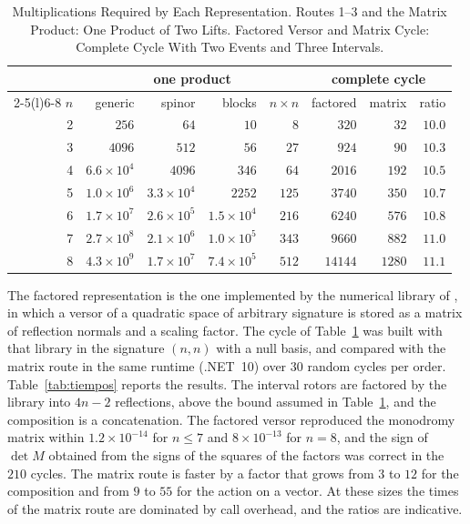 \documentclass[journal]{IEEEtran}
\begin{document}
\begin{table}[!h]
\caption{Multiplications Required by Each Representation. Routes 1--3 and
the Matrix Product: One Product of Two Lifts. Factored Versor and Matrix
Cycle: Complete Cycle With Two Events and Three Intervals.}
\label{tab:coste}
\centering
\footnotesize
\setlength{\tabcolsep}{3pt}
\begin{tabular}{@{}rrrrrrrr@{}}
\toprule
 & \multicolumn{4}{c}{one product} & \multicolumn{3}{c}{complete cycle} \\
\cmidrule(lr){2-5}\cmidrule(l){6-8}
$n$ & generic & spinor & blocks & $n\times n$ & factored & matrix & ratio \\
\midrule
2 & $256$ & $64$ & $10$ & $8$ & $320$ & $32$ & $10.0$ \\
3 & $4096$ & $512$ & $56$ & $27$ & $924$ & $90$ & $10.3$ \\
4 & $6.6\times10^{4}$ & $4096$ & $346$ & $64$ & $2016$ & $192$ & $10.5$ \\
5 & $1.0\times10^{6}$ & $3.3\times10^{4}$ & $2252$ & $125$ & $3740$ & $350$ & $10.7$ \\
6 & $1.7\times10^{7}$ & $2.6\times10^{5}$ & $1.5\times10^{4}$ & $216$ & $6240$ & $576$ & $10.8$ \\
7 & $2.7\times10^{8}$ & $2.1\times10^{6}$ & $1.0\times10^{5}$ & $343$ & $9660$ & $882$ & $11.0$ \\
8 & $4.3\times10^{9}$ & $1.7\times10^{7}$ & $7.4\times10^{5}$ & $512$ & $14144$ & $1280$ & $11.1$ \\
\bottomrule
\end{tabular}
\end{table}

The factored representation is the one implemented by the numerical library
of \cite{eid2025gafl}, in which a versor of a quadratic space of arbitrary
signature is stored as a matrix of reflection normals and a scaling factor.
The cycle of Table~\ref{tab:coste} was built with that library in the
signature $(n,n)$ with a null basis, and compared with the matrix route in
the same runtime (.NET~10) over $30$ random cycles per order.
Table~\ref{tab:tiempos} reports the results. The interval rotors are
factored by the library into $4n-2$ reflections, above the bound assumed in
Table~\ref{tab:coste}, and the composition is a concatenation. The factored
versor reproduced the monodromy matrix within $1.2\times10^{-14}$ for
$n\le7$ and $8\times10^{-13}$ for $n=8$, and the sign of $\det M$ obtained
from the signs of the squares of the factors was correct in the $210$
cycles. The matrix route is faster by a factor that grows from $3$ to $12$
for the composition and from $9$ to $55$ for the action on a vector. At
these sizes the times of the matrix route are dominated by call overhead,
and the ratios are indicative.
\end{document}
